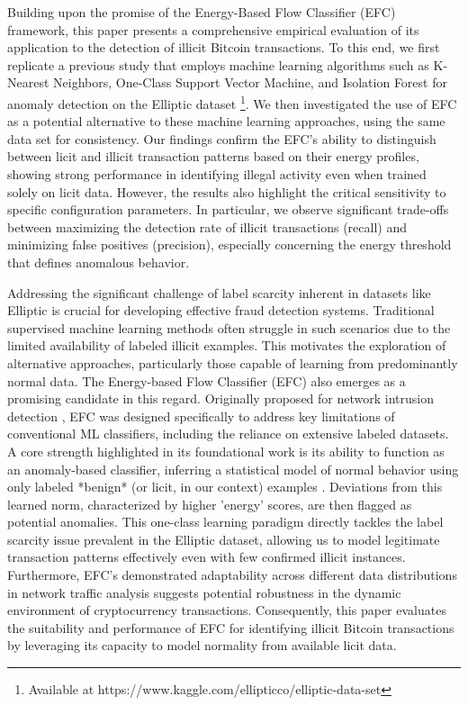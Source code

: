 Building upon the promise of the Energy-Based Flow Classifier (EFC) framework, this paper presents a comprehensive empirical
evaluation of its application to the detection of illicit Bitcoin transactions. To this end, we first replicate a previous
study that employs machine learning algorithms such as K-Nearest Neighbors, One-Class Support Vector Machine, and Isolation
Forest for anomaly detection on the Elliptic dataset \footnote{Available at https://www.kaggle.com/ellipticco/elliptic-data-set}.
We then investigated the use of EFC as a potential alternative to these machine learning approaches, using the same data set
for consistency. Our findings confirm the EFC's ability to distinguish between licit and illicit transaction patterns based
on their energy profiles, showing strong performance in identifying illegal activity even when trained solely on licit data.
However, the results also highlight the critical sensitivity to specific configuration parameters. In particular, we observe
significant trade-offs between maximizing the detection rate of illicit transactions (recall) and minimizing false positives
(precision), especially concerning the energy threshold that defines anomalous behavior. 

Addressing the significant challenge of label scarcity inherent in datasets like Elliptic is crucial for developing effective
fraud detection systems. Traditional supervised machine learning methods often struggle in such scenarios due to the limited
availability of labeled illicit examples. This motivates the exploration of alternative approaches, particularly those capable
of learning from predominantly normal data. The Energy-based Flow Classifier (EFC) also emerges as a promising candidate
in this regard. Originally proposed for network intrusion detection \cite{pontes2019, souza2022novelopensetenergybased},
EFC was designed specifically to address key limitations of conventional ML classifiers, including the reliance on extensive
labeled datasets. A core strength highlighted in its foundational work is its ability to function as an anomaly-based classifier,
inferring a statistical model of normal behavior using only labeled *benign* (or licit, in our context) examples
\cite{souza2022novelopensetenergybased}. Deviations from this learned norm, characterized by higher 'energy' scores, are
then flagged as potential anomalies. This one-class learning paradigm directly tackles the label scarcity issue prevalent
in the Elliptic dataset, allowing us to model legitimate transaction patterns effectively even with few confirmed illicit
instances. Furthermore, EFC's demonstrated adaptability across different data distributions in network traffic analysis
suggests potential robustness in the dynamic environment of cryptocurrency transactions. Consequently, this paper evaluates
the suitability and performance of EFC for identifying illicit Bitcoin transactions by leveraging its capacity to model
normality from available licit data.


